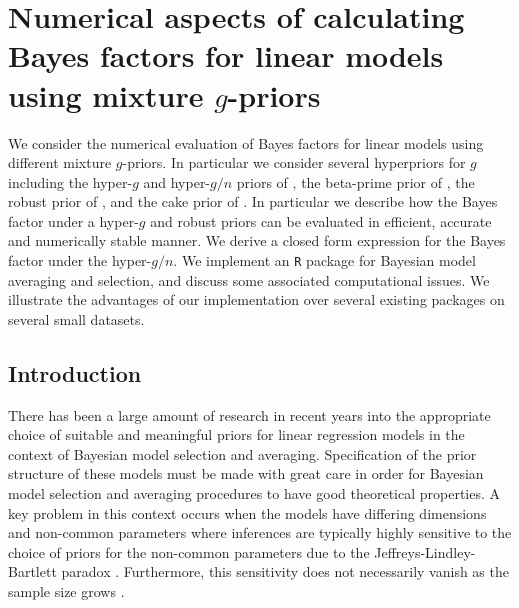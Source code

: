 
\chapter{Numerical aspects of calculating Bayes factors for linear models using
	mixture $g$-priors}

We consider the numerical evaluation of Bayes factors for linear models using different mixture 
$g$-priors. In particular we consider several hyperpriors for $g$ including  the hyper-$g$ and 
hyper-$g/n$ priors of \cite{Liang2008}, the beta-prime prior of \cite{Maruyama2011}, the robust 
prior of \cite{Bayarri2012}, and the cake prior of \cite{OrmerodEtal2017}. In particular we 
describe how the Bayes factor under a hyper-$g$ and robust priors can be evaluated in efficient, 
accurate and numerically stable manner. We derive a closed form expression for the Bayes factor 
under the hyper-$g/n$. We implement an {\tt R} package for Bayesian model averaging and selection,
and discuss some associated computational issues. We illustrate the advantages of our implementation 
over several existing packages on several small datasets.


\section{Introduction}

There has been a large amount of research in recent years into the appropriate choice of suitable 
and meaningful priors for linear regression models in the context of Bayesian model selection and 
averaging. Specification of the prior structure of these models must be made with great care in 
order for Bayesian model selection and averaging procedures to have good theoretical properties. 
A key problem in this context occurs when the models have differing dimensions and non-common 
parameters where inferences are typically highly sensitive to the choice of priors for the 
non-common parameters due to the Jeffreys-Lindley-Bartlett paradox \citep{Lindley1957,Bartlett1957,OrmerodEtal2017}.
Furthermore, this sensitivity does not necessarily vanish as the sample size 
grows \cite{Kass1995,Berger2001}.  

